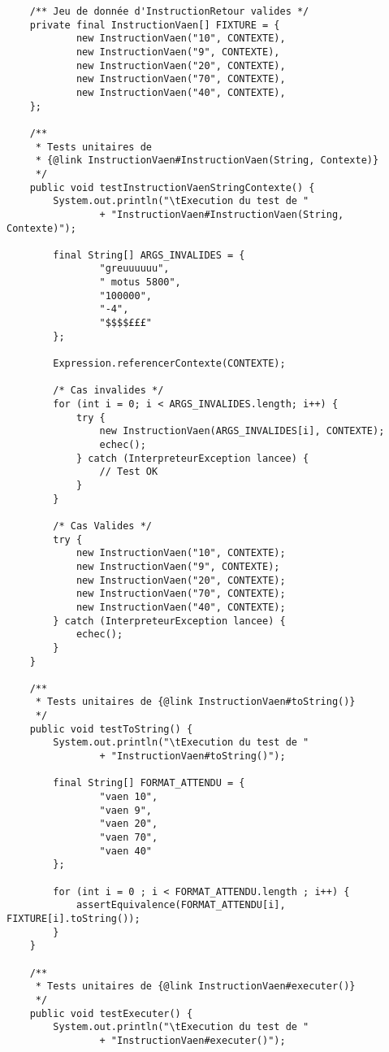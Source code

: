 \begin{enum}
\begin{verbatim}
    /** Jeu de donnée d'InstructionRetour valides */
    private final InstructionVaen[] FIXTURE = {
            new InstructionVaen("10", CONTEXTE),
            new InstructionVaen("9", CONTEXTE),
            new InstructionVaen("20", CONTEXTE),
            new InstructionVaen("70", CONTEXTE),
            new InstructionVaen("40", CONTEXTE),
    };

    /**
     * Tests unitaires de
     * {@link InstructionVaen#InstructionVaen(String, Contexte)}
     */
    public void testInstructionVaenStringContexte() {
        System.out.println("\tExecution du test de "
                + "InstructionVaen#InstructionVaen(String, Contexte)");
        
        final String[] ARGS_INVALIDES = {
                "greuuuuuu",
                " motus 5800",
                "100000",
                "-4",
                "$$$$£££"
        };

        Expression.referencerContexte(CONTEXTE);

        /* Cas invalides */
        for (int i = 0; i < ARGS_INVALIDES.length; i++) {
            try {
                new InstructionVaen(ARGS_INVALIDES[i], CONTEXTE);
                echec();
            } catch (InterpreteurException lancee) {
                // Test OK
            }
        }
        
        /* Cas Valides */
        try {
            new InstructionVaen("10", CONTEXTE);
            new InstructionVaen("9", CONTEXTE);
            new InstructionVaen("20", CONTEXTE);
            new InstructionVaen("70", CONTEXTE);
            new InstructionVaen("40", CONTEXTE);
        } catch (InterpreteurException lancee) {
            echec();
        }
    }

    /**
     * Tests unitaires de {@link InstructionVaen#toString()}
     */
    public void testToString() {
        System.out.println("\tExecution du test de "
                + "InstructionVaen#toString()");
        
        final String[] FORMAT_ATTENDU = {
                "vaen 10",
                "vaen 9",
                "vaen 20",
                "vaen 70",
                "vaen 40"
        };
        
        for (int i = 0 ; i < FORMAT_ATTENDU.length ; i++) {
            assertEquivalence(FORMAT_ATTENDU[i], FIXTURE[i].toString());
        }
    }

    /**
     * Tests unitaires de {@link InstructionVaen#executer()}
     */
    public void testExecuter() {
        System.out.println("\tExecution du test de "
                + "InstructionVaen#executer()");
        

\end{verbatim}
\end{enum}
